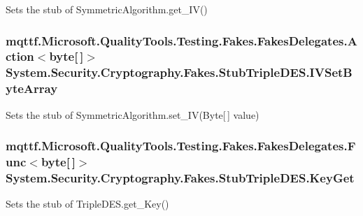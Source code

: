 Sets the stub of Symmetric\-Algorithm.\-get\-\_\-\-I\-V()

\hypertarget{class_system_1_1_security_1_1_cryptography_1_1_fakes_1_1_stub_triple_d_e_s_a08b7243e941ab76fd45fc82177838220}{
\subsubsection[{I\-V\-Set\-Byte\-Array}]{\setlength{\rightskip}{0pt plus 5cm}mqttf.\-Microsoft.\-Quality\-Tools.\-Testing.\-Fakes.\-Fakes\-Delegates.\-Action$<$byte\mbox{[}$\,$\mbox{]}$>$ System.\-Security.\-Cryptography.\-Fakes.\-Stub\-Triple\-D\-E\-S.\-I\-V\-Set\-Byte\-Array}}\label{class_system_1_1_security_1_1_cryptography_1_1_fakes_1_1_stub_triple_d_e_s_a08b7243e941ab76fd45fc82177838220}


Sets the stub of Symmetric\-Algorithm.\-set\-\_\-\-I\-V(\-Byte\mbox{[}$\,$\mbox{]} value)

\hypertarget{class_system_1_1_security_1_1_cryptography_1_1_fakes_1_1_stub_triple_d_e_s_ab5c81b6496746d06323bef15d67ed64b}{
\subsubsection[{Key\-Get}]{\setlength{\rightskip}{0pt plus 5cm}mqttf.\-Microsoft.\-Quality\-Tools.\-Testing.\-Fakes.\-Fakes\-Delegates.\-Func$<$byte\mbox{[}$\,$\mbox{]}$>$ System.\-Security.\-Cryptography.\-Fakes.\-Stub\-Triple\-D\-E\-S.\-Key\-Get}}\label{class_system_1_1_security_1_1_cryptography_1_1_fakes_1_1_stub_triple_d_e_s_ab5c81b6496746d06323bef15d67ed64b}


Sets the stub of Triple\-D\-E\-S.\-get\-\_\-\-Key()

